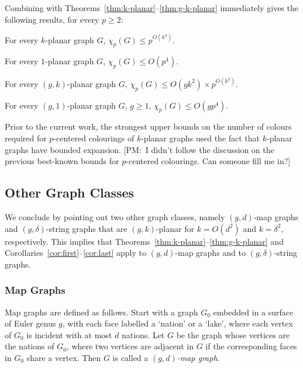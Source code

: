 \documentclass{patmorin}
\newcommand{\note}[2]{{\color{red}[#1:~#2]}}
\begin{document}
Combining  with Theorems~\ref{thm:k-planar}--\ref{thm:g-k-planar} immediately gives the following results, for every $p\ge 2$:

\begin{cor}
  For every $k$-planar graph $G$, $\chi_p(G)\le p^{O(k^3)}$.
\end{cor}

\begin{cor}
  For every $1$-planar graph $G$, $\chi_p(G)\le O(p^4)$. 
\end{cor}

\begin{cor}
  For every $(g,k)$-planar graph $G$, $\chi_p(G)\le O(gk^2)\times p^{O(k^3)}$. 
\end{cor}

\begin{cor}
  For every $(g,1)$-planar graph $G$, $g\ge 1$, $\chi_p(G)\le O(gp^4)$.
\end{cor}

Prior to the current work, the strongest upper bounds on the number of colours required for $p$-centered colourings of $k$-planar graphs used the fact that $k$-planar graphs have bounded expansion.  \note{PM}{I didn't follow the discussion on the previous best-known bounds for $p$-centered colourings.  Can someone fill me in?}

\subsection{Other Graph Classes}

We conclude by pointing out two other graph classes, namely $(g,d)$-map graphs and $(g,\delta)$-string graphs that are $(g,k)$-planar for $k=O(d^2)$ and $k=\delta^2$, respectively.  This implies that Theorems~\ref{thm:k-planar}--\ref{thm:g-k-planar} and Corollaries~\ref{cor:first}--\ref{cor:last} apply to $(g,d)$-map graphs and to $(g,\delta)$-string graphs.


\subsubsection{Map Graphs}

Map graphs are defined as follows. Start with a graph $G_0$ embedded in a surface of Euler genus $g$, with each face labelled a `nation' or a `lake', where each vertex of $G_0$ is incident with at most $d$ nations. Let $G$ be the graph whose vertices are the nations of $G_0$, where two vertices are adjacent in $G$ if the corresponding faces in $G_0$ share a vertex. Then $G$ is called a \emph{$(g,d)$-map graph}. 
\end{document}

